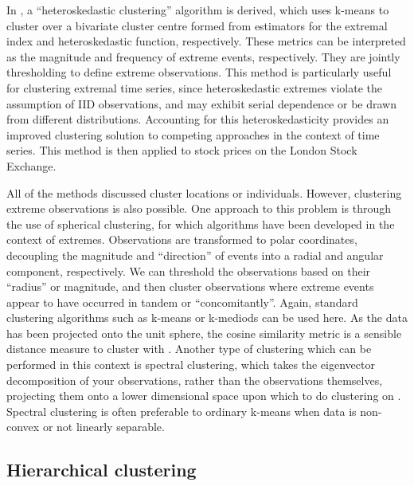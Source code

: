 \documentclass{article}
\numberwithin{equation}{section}
\begin{document}
In \citet{deCarvalho2023}, a ``heteroskedastic clustering'' algorithm is derived, which uses k-means to cluster over a bivariate cluster centre formed from estimators for the extremal index and heteroskedastic function, respectively. 
These metrics can be interpreted as the magnitude and frequency of extreme events, respectively.
They are jointly thresholding to define extreme observations.
This method is particularly useful for clustering extremal time series, since heteroskedastic extremes violate the assumption of IID observations, and may exhibit serial dependence or be drawn from different distributions. 
Accounting for this heteroskedasticity provides an improved clustering solution to competing approaches in the context of time series. 
This method is then applied to stock prices on the London Stock Exchange. 

All of the methods discussed cluster locations or individuals. 
However, clustering extreme observations is also possible. 
One approach to this problem is through the use of spherical clustering, for which algorithms have been developed in the context of extremes.
Observations are transformed to polar coordinates, decoupling the magnitude and ``direction'' of events into a radial and angular component, respectively.
We can threshold the observations based on their ``radius'' or magnitude, and then cluster observations where extreme events appear to have occurred in tandem or ``concomitantly''.
Again, standard clustering algorithms such as k-means or k-mediods can be used here.
As the data has been projected onto the unit sphere, the cosine similarity metric is a sensible distance measure to cluster with \citep{Fomichov2022, Janen2020, deCarvalho2024}.
Another type of clustering which can be performed in this context is spectral clustering, which takes the eigenvector decomposition of your observations, rather than the observations themselves, projecting them onto a lower dimensional space upon which to do clustering on \citet{Ng2001, Vonluxburg2007}.
Spectral clustering is often preferable to ordinary k-means when data is non-convex or not linearly separable. 

\subsection{Hierarchical clustering}
\end{document}
